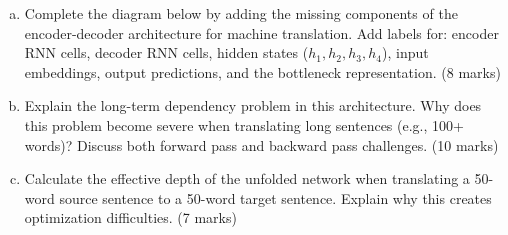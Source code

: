 \documentclass[12pt]{article}
\newcommand{\shortanswer}{\vspace{2cm}}          %
\newcommand{\mediumanswer}{\vspace{3cm}}         %
\newcommand{\longanswer}{\vspace{4cm}}           %
\begin{document}
\begin{enumerate}[(a)]
    \item Complete the diagram below by adding the missing components of the encoder-decoder architecture for machine translation. Add labels for: encoder RNN cells, decoder RNN cells, hidden states ($h_1, h_2, h_3, h_4$), input embeddings, output predictions, and the bottleneck representation. \hfill (8 marks)
    
    \begin{center}
    \end{center}
    
    \shortanswer
    
    \item Explain the long-term dependency problem in this architecture. Why does this problem become severe when translating long sentences (e.g., 100+ words)? Discuss both forward pass and backward pass challenges. \hfill (10 marks)
    
    \longanswer
    
    \item Calculate the effective depth of the unfolded network when translating a 50-word source sentence to a 50-word target sentence. Explain why this creates optimization difficulties. \hfill (7 marks)
    
    \mediumanswer
\end{enumerate}
\end{document}
